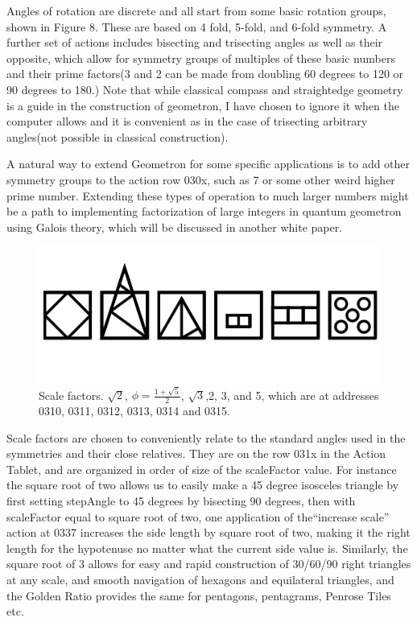 \documentclass[11pt]{article}
\begin{document}
    Angles of rotation are discrete and all start from some basic rotation groups, shown in Figure 8.  These are based on 4 fold, 5-fold, and 6-fold symmetry.  A further set of actions includes bisecting and trisecting angles as well as their opposite, which allow for symmetry groups of multiples of these basic numbers and their prime factors(3 and 2 can be made from doubling 60 degrees to 120 or 90 degrees to 180.)  Note that while classical compass and straightedge geometry is a guide in the construction of geometron, I have chosen to ignore it when the computer allows and it is convenient as in the case of trisecting arbitrary angles(not possible in classical construction).      




    A natural way to extend Geometron for some specific applications is to add other symmetry groups to the action row 030x, such as 7 or some other weird higher prime number.  Extending these types of operation to much larger numbers might be a path to implementing factorization of large integers in quantum geometron using Galois theory, which will be discussed in another white paper.


\begin{figure}

\includegraphics{figures/figure9_scales.png}

\caption{Scale factors.  $\sqrt{2}$, $\phi = \frac{1 + \sqrt{5}}{2}$, $\sqrt{3}$,2, 3, and 5, which are at addresses 0310, 0311, 0312, 0313, 0314 and 0315.}
\end{figure}




    Scale factors are chosen to conveniently relate to the standard angles used in the symmetries and their close relatives.  They are on the row 031x in the Action Tablet, and are organized in order of size of the scaleFactor value.  For instance the square root of two allows us to easily make a 45 degree isosceles triangle by first setting stepAngle to 45 degrees by bisecting 90 degrees, then with scaleFactor equal to square root of two, one application of the``increase scale'' action at 0337 increases the side length by square root of two, making it the right length for the hypotenuse no matter what the current side value is.  Similarly, the square root of 3 allows for easy and rapid construction of 30/60/90 right triangles at any scale, and smooth navigation of hexagons and equilateral triangles, and the Golden Ratio provides the same for pentagons, pentagrams, Penrose Tiles etc.  
\end{document}
